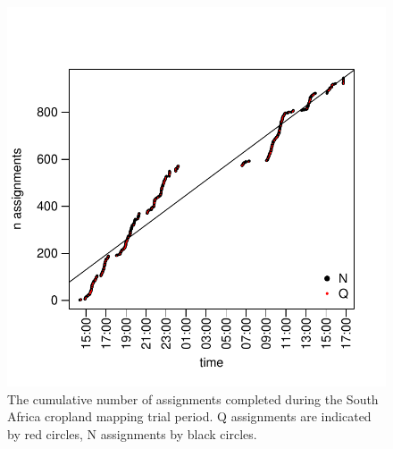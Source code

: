 \documentclass[preprint,12pt,authoryear]{elsarticle}
\begin{document}
\begin{figure}[!ht]
       \begin{center}
      \includegraphics[scale=1]{figures/figS2.pdf} 
        \end{center}
      \caption{The cumulative number of assignments completed during the South Africa cropland mapping trial period. Q assignments are indicated by red circles, N assignments by black circles.}
      \label{fig:default}
\end{figure}
\end{document}
